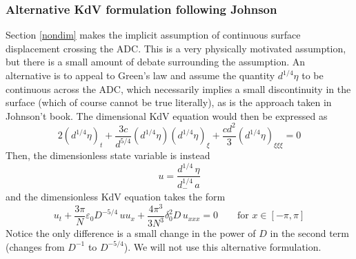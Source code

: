 \documentclass[11pt]{article}
\newcommand{\eps}{\varepsilon}
\newcommand{\freqp}{f_p}
\newcommand{\amp}{a}
\newcommand{\depth}{d}
\newcommand{\dup}{\depth_{-}}
\newcommand{\lam}{\lambda}
\newcommand{\lamfac}{N}
\newcommand{\drat}{D}
\newcommand{\epsup}{\eps_0}
\newcommand{\delup}{\delta_0}
\begin{document}
\begin{comment}
{\bf Sidenote}: In the case of constant depth, if one simply uses the most naive scales, $u = \eta/\amp$, $\tilde{x} = \xi/\lam$, $\tilde{t} = t \freqp$, then the dimensionless KdV is the more standard one:
\begin{equation}
2 u_t + 3 \eps u u_x + \frac{\delta^2}{3} u_{xxx} = 0
\end{equation}
where $\eps = a/h$ and $\delta = h/\lam$.
\end{comment}


\subsubsection{Alternative KdV formulation following Johnson}
Section \ref{nondim} makes the implicit assumption of continuous surface displacement crossing the ADC. This is a very physically motivated assumption, but there is a small amount of debate surrounding the assumption. An alternative is to appeal to Green's law and assume the quantity $\depth^{1/4} \eta$ to be continuous across the ADC, which necessarily implies a small discontinuity in the surface (which of course cannot be true literally), as is the approach taken in Johnson't book. The dimensional KdV equation would then be expressed as
\begin{equation}
2 (\depth^{1/4} \eta)_t + \frac{3 c}{\depth^{5/4}} (\depth^{1/4} \eta) (\depth^{1/4} \eta)_{\xi} + \frac{c \depth^2}{3} (\depth^{1/4} \eta)_{\xi \xi \xi} = 0
\end{equation}
Then, the dimensionless state variable is instead 
\begin{equation}
u = \frac{\depth^{1/4} \, \eta}{ \dup^{1/4} \, \amp}
\end{equation}
and the dimensionless KdV equation takes the form
\begin{equation}
u_t + \frac{3 \pi}{\lamfac} \epsup \drat^{-5/4} \, u u_x + \frac{4 \pi^3}{3 \lamfac^3} \delup^2 \drat \, u_{xxx} = 0
\qquad \text{for } x \in [-\pi,\pi]
\end{equation}
Notice the only difference is a small change in the power of $\drat$ in the second term (changes from $\drat^{-1}$ to $\drat^{-5/4}$).
We will not use this alternative formulation.

\end{document}
